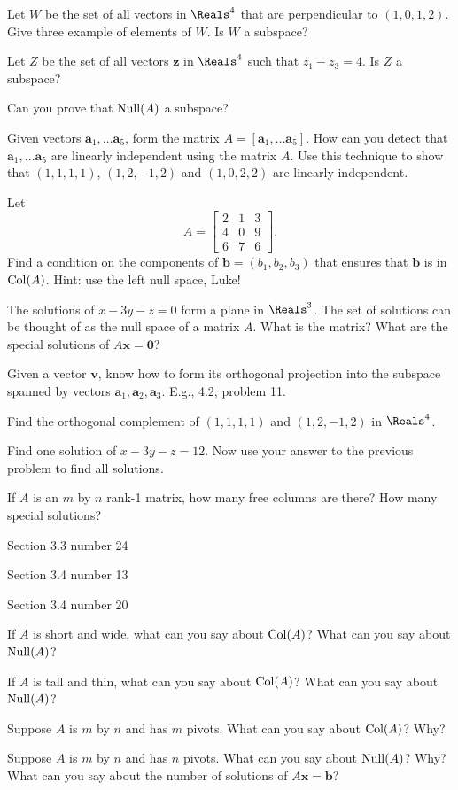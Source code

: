 \documentclass[minion]{homework}
\newcommand{\va}{\mathbf{a}}
\newcommand{\vb}{\mathbf{b}}
\newcommand{\vx}{\mathbf{x}}
\newcommand{\vz}{\mathbf{z}}
\newcommand{\vv}{\mathbf{v}}
\newcommand{\vzero}{\mathbf{0}}
\DeclareMathOperator{\Col}{\rm Col}
\DeclareMathOperator{\Null}{\rm Null}
\begin{document}
Let $W$ be the set of all vectors in $\Reals^4$ that are perpendicular to 
$(1,0,1,2)$.  Give three example of elements of $W$.  Is $W$ a subspace?

Let $Z$ be the set of all vectors $\vz$ in $\Reals^4$ such that $z_1-z_3=4$.
Is $Z$ a subspace?

Can you prove that $\Null(A)$ a subspace?

Given vectors $\va_1,\ldots \va_5$, form the matrix $A=[\va_1,\ldots\va_5]$.
How can you detect that $\va_1,\ldots \va_5$ are linearly independent using 
the matrix $A$.  Use this technique to show that $(1,1,1,1)$, $(1,2,-1,2)$
and $(1,0,2,2)$ are linearly independent.

Let 
$$A=\begin{bmatrix} 2 &1 &3 \\
4 & 0 & 9\\
6 & 7 & 6 \end{bmatrix}.
$$  Find a condition on the components of $\vb=(b_1,b_2,b_3)$ that
ensures that $\vb$ is in $\Col(A)$.  Hint: use the left null space, Luke!

The solutions of $x-3y-z=0$ form a plane in $\Reals^3$.  The set of solutions can be thought of as the null space of a matrix $A$.  What is the matrix?  What are the special solutions of $A\vx=\vzero$?

Given a vector $\vv$, know how to form its orthogonal projection
into the subspace spanned by vectors $\va_1,\va_2,\va_3$.  E.g., 4.2, problem 11.

Find the orthogonal complement of $(1,1,1,1)$ and $(1,2,-1,2)$ in $\Reals^4$.

Find one solution of $x-3y-z=12$.  Now use your answer to the previous problem 
to find all solutions.

If $A$ is an $m$ by $n$ rank-1 matrix, how many free columns are there? How many special solutions?

Section 3.3 number 24

Section 3.4 number 13

Section 3.4 number 20


If $A$ is short and wide, what can you say about $\Col(A)$?  What can you say about $\Null(A)$?

If $A$ is tall and thin, what can you say about $\Col(A)$?  What can you say about $\Null(A)$?

Suppose $A$ is $m$ by $n$ and has $m$ pivots.  What can you say about $\Col(A)$? Why? 

Suppose $A$ is $m$ by $n$ and has $n$ pivots.  What can you say about $\Null(A)$?  Why? What can you say about the number of solutions of
$A\vx=\vb$? 
\end{document}
